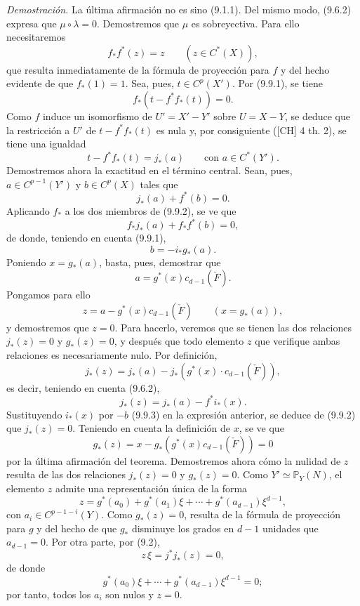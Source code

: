 \emph{Demostración.} La última afirmación no es sino (9.1.1). Del mismo modo, (9.6.2) expresa que $\mu\circ\lambda=0$. Demostremos que $\mu$ es sobreyectiva. Para ello necesitaremos
\[
f_*f^*(z)=z\qquad(z\in C^*(X)),
\tag{9.9.1}
\]
que resulta inmediatamente de la fórmula de proyección para $f$ y del hecho evidente de que $f_*(1)=1$. Sea, pues, $t\in C^p(X')$. Por (9.9.1), se tiene
\[
f_*(t-f^*f_*(t))=0.
\]
Como $f$ induce un isomorfismo de $U'=X'-Y'$ sobre $U=X-Y$, se deduce que la restricción a $U'$ de $t-f^*f_*(t)$ es nula y, por consiguiente ([CH] 4 th. 2), se tiene una igualdad
\[
t-f^*f_*(t)=j_*(a)
\qquad\text{con }a\in C^*(Y').
\]
Demostremos ahora la exactitud en el término central. Sean, pues, $a\in C^{p-1}(Y')$ y $b\in C^p(X)$ tales que
\[
j_*(a)+f^*(b)=0.
\tag{9.9.2}
\]
Aplicando $f_*$ a los dos miembros de (9.9.2), se ve que
\[
f_*j_*(a)+f_*f^*(b)=0,
\]
de donde, teniendo en cuenta (9.9.1),
\[
b=-i_*g_*(a).
\tag{9.9.3}
\]
Poniendo $x=g_*(a)$, basta, pues, demostrar que
\[
a=g^*(x)c_{d-1}(\check F).
\tag{9.9.4}
\]
Pongamos para ello
\[
z=a-g^*(x)c_{d-1}(\check F)\qquad(x=g_*(a)),
\]
y demostremos que $z=0$. Para hacerlo, veremos que se tienen las dos relaciones $j_*(z)=0$ y $g_*(z)=0$, y después que todo elemento $z$ que verifique ambas relaciones es necesariamente nulo. Por definición,
\[
j_*(z)=j_*(a)-j_*(g^*(x)\cdot c_{d-1}(\check F)),
\]
es decir, teniendo en cuenta (9.6.2),
\[
j_*(z)=j_*(a)-f^*i_*(x).
\]
Sustituyendo $i_*(x)$ por $-b$ (9.9.3) en la expresión anterior, se deduce de (9.9.2) que $j_*(z)=0$. Teniendo en cuenta la definición de $x$, se ve que
\[
g_*(z)=x-g_*(g^*(x)c_{d-1}(\check F))=0
\]
por la última afirmación del teorema. Demostremos ahora cómo la nulidad de $z$ resulta de las dos relaciones $j_*(z)=0$ y $g_*(z)=0$. Como $Y'\simeq\mathbb P_Y(N)$, el elemento $z$ admite una representación única de la forma
\[
z=g^*(a_0)+g^*(a_1)\xi+\cdots+g^*(a_{d-1})\xi^{d-1},
\]
con $a_i\in C^{p-1-i}(Y)$. Como $g_*(z)=0$, resulta de la fórmula de proyección para $g$ y del hecho de que $g_*$ disminuye los grados en $d-1$ unidades que $a_{d-1}=0$. Por otra parte, por (9.2),
\[
z\,\xi=j^*j_*(z)=0,
\]
de donde
\[
g^*(a_0)\xi+\cdots+g^*(a_{d-1})\xi^{d-1}=0;
\]
por tanto, todos los $a_i$ son nulos y $z=0$.

